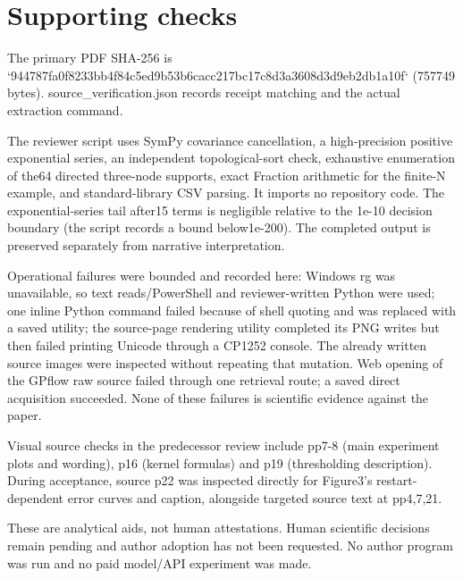 \documentclass[10pt]{article}
\begin{document}
\section*{Supporting checks}
The primary PDF SHA-256 is `944787fa0f8233bb4f84c5ed9b53b6cacc217bc17c8d3a3608d3d9eb2db1a10f` (757749 bytes). source\_verification.json records receipt matching and the actual extraction command.\par
The reviewer script uses SymPy covariance cancellation, a high-precision positive exponential series, an independent topological-sort check, exhaustive enumeration of the64 directed three-node supports, exact Fraction arithmetic for the finite-N example, and standard-library CSV parsing. It imports no repository code. The exponential-series tail after15 terms is negligible relative to the 1e-10 decision boundary (the script records a bound below1e-200). The completed output is preserved separately from narrative interpretation.\par
Operational failures were bounded and recorded here: Windows rg was unavailable, so text reads/PowerShell and reviewer-written Python were used; one inline Python command failed because of shell quoting and was replaced with a saved utility; the source-page rendering utility completed its PNG writes but then failed printing Unicode through a CP1252 console. The already written source images were inspected without repeating that mutation. Web opening of the GPflow raw source failed through one retrieval route; a saved direct acquisition succeeded. None of these failures is scientific evidence against the paper.\par
Visual source checks in the predecessor review include pp7-8 (main experiment plots and wording), p16 (kernel formulas) and p19 (thresholding description). During acceptance, source p22 was inspected directly for Figure3’s restart-dependent error curves and caption, alongside targeted source text at pp4,7,21.\par
These are analytical aids, not human attestations. Human scientific decisions remain pending and author adoption has not been requested. No author program was run and no paid model/API experiment was made.\par
\end{document}
